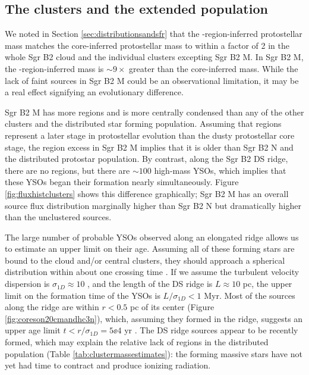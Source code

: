\documentclass[twocolumn]{aastex61}
\begin{document}
\subsection{The clusters and the extended population}
\label{sec:clustersandextended}
We noted in Section \ref{sec:distributionsandsfr} that the \hii-region-inferred
protostellar mass matches the core-inferred protostellar mass to within a
factor of 2 in the whole Sgr B2 cloud and the individual clusters excepting Sgr
B2 M.  In Sgr B2 M, the \hii-region-inferred mass is $\sim9\times$ greater than
the core-inferred mass.  While the lack of faint sources in Sgr B2 M could
be an observational limitation, it may be a real effect signifying an evolutionary
difference.

Sgr B2 M has more \hii regions and is more centrally condensed than any of the
other clusters and the distributed star forming population.  Assuming that \hii
regions represent a later stage in protostellar evolution than the dusty
protostellar core stage, the \hii region excess in Sgr B2 M implies that it is
older than Sgr B2 N and the distributed protostar population.  By contrast,
along the Sgr B2 DS ridge, there are no \hii regions, but there are $\sim100$
high-mass YSOs, which implies that these YSOs began their formation
nearly simultaneously.  Figure \ref{fig:fluxhistclusters} shows this difference
graphically; Sgr B2 M has an overall source flux distribution marginally higher
than Sgr B2 N but dramatically higher than the unclustered sources.

The large number of probable YSOs observed along an elongated ridge allows us
to estimate an upper limit on their age.  Assuming all of these forming stars
are bound to the cloud and/or central clusters, they should approach a
spherical distribution within about one crossing time \citep{Efremov1998a}.  If
we assume the turbulent velocity dispersion is $\sigma_{1D}\approx10$ \kms
\citep[e.g.,][]{Henshaw2016a}, and the length of the DS ridge is $L\approx10$
pc, the upper limit on the formation time of the YSOs is $L/\sigma_{1D}<1$ Myr.
Most of the sources along the ridge are within $r<0.5$ pc of its center (Figure
\ref{fig:coreson20cmandhc3n}),
which, assuming they
formed in the ridge, suggests an upper age limit $t<r/\sigma_{1D}=5\ee{4}$ yr
\citep[however, the stars may have a lower velocity dispersion by a factor of
5-10, implying a more conservative upper age limit is $t<0.5$
Myr; ][]{Offner2009c}.
The DS ridge sources appear to be recently formed, which may explain the
relative lack of \hii regions in the distributed population (Table
\ref{tab:clustermassestimates}): the forming massive stars have not yet had
time to contract and produce ionizing radiation.
\end{document}

